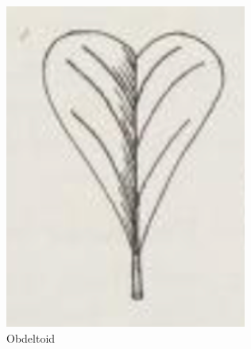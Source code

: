 \documentclass[12pt,english]{article}
\begin{document}
\begin{figure}[!hbt]
\begin{centre}
\begin{minipage}{0.19\textwidth}
		\includegraphics[width=\textwidth]{../code/contour/original/obcordate}
	\end{minipage}
	\begin{minipage}{0.19\textwidth}
		\caption{Obdeltoid}

\end{minipage}
\end{centre}
\end{figure}
\end{document}
